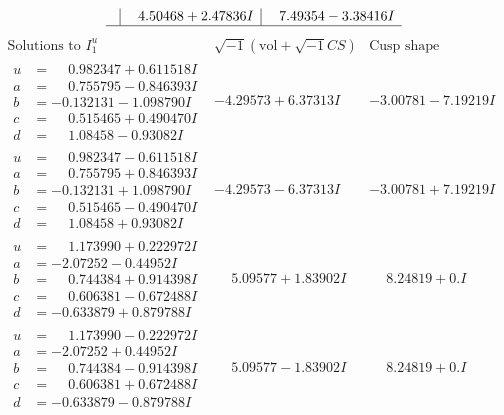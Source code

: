 \documentclass[1p]{elsarticle_modified}
\theoremstyle{definition}
\newcommand{\I}{\sqrt{-1}}
\begin{document}
$$\begin{array}{c|c|c}
 & \phantom{-}4.50468 + 2.47836 I & \phantom{-}7.49354 - 3.38416 I\\
 \hline 
 \end{array}$$\newpage$$\begin{array}{c|c|c}  
\text{Solutions to }I^u_{1}& \I (\text{vol} + \sqrt{-1}CS) & \text{Cusp shape}\\
 \hline 
\begin{aligned}
u &= \phantom{-}0.982347 + 0.611518 I \\
a &= \phantom{-}0.755795 - 0.846393 I \\
b &= -0.132131 - 1.098790 I \\
c &= \phantom{-}0.515465 + 0.490470 I \\
d &= \phantom{-}1.08458 - 0.93082 I\end{aligned}
 & -4.29573 + 6.37313 I & -3.00781 - 7.19219 I \\ \hline\begin{aligned}
u &= \phantom{-}0.982347 - 0.611518 I \\
a &= \phantom{-}0.755795 + 0.846393 I \\
b &= -0.132131 + 1.098790 I \\
c &= \phantom{-}0.515465 - 0.490470 I \\
d &= \phantom{-}1.08458 + 0.93082 I\end{aligned}
 & -4.29573 - 6.37313 I & -3.00781 + 7.19219 I \\ \hline\begin{aligned}
u &= \phantom{-}1.173990 + 0.222972 I \\
a &= -2.07252 - 0.44952 I \\
b &= \phantom{-}0.744384 + 0.914398 I \\
c &= \phantom{-}0.606381 - 0.672488 I \\
d &= -0.633879 + 0.879788 I\end{aligned}
 & \phantom{-}5.09577 + 1.83902 I & \phantom{-}8.24819 + 0. I\phantom{ +0.000000I} \\ \hline\begin{aligned}
u &= \phantom{-}1.173990 - 0.222972 I \\
a &= -2.07252 + 0.44952 I \\
b &= \phantom{-}0.744384 - 0.914398 I \\
c &= \phantom{-}0.606381 + 0.672488 I \\
d &= -0.633879 - 0.879788 I\end{aligned}
 & \phantom{-}5.09577 - 1.83902 I & \phantom{-}8.24819 + 0. I\phantom{ +0.000000I} \\ \hline\begin{aligned}

\end{aligned}
\end{array}$$
\end{document}
